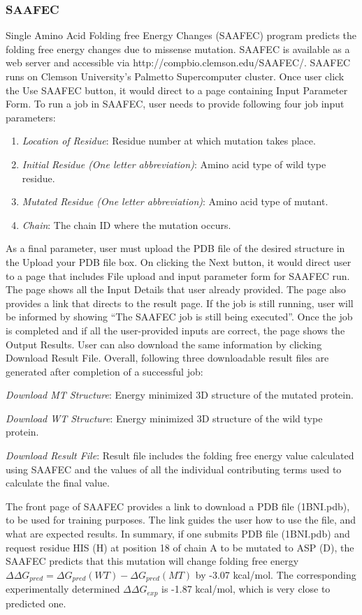 \documentclass[9pt,tutorial]{livecoms}
\begin{document}
\subsubsection{SAAFEC} Single Amino Acid Folding free Energy Changes (SAAFEC) program\cite{getov2016saafec} predicts the folding free energy changes due to missense mutation. SAAFEC is available as a web server and accessible via http://compbio.clemson.edu/SAAFEC/. SAAFEC runs on Clemson University’s Palmetto Supercomputer cluster. Once user click the Use SAAFEC button, it would direct to a page containing Input Parameter Form. To run a job in SAAFEC, user needs to provide following four job input parameters:
\begin{enumerate}
\item \textit{Location of Residue}: Residue number at which mutation takes place.
\item \textit{Initial Residue (One letter abbreviation)}: Amino acid type of wild type residue.
\item \textit{Mutated Residue (One letter abbreviation)}: Amino acid type of mutant. 
\item \textit{Chain}: The chain ID where the mutation occurs.
\end{enumerate}
As a final parameter, user must upload the PDB file of the desired structure in the Upload your PDB file box. On clicking the Next button, it would direct user to a page that includes File upload and input parameter form for SAAFEC run. The page shows all the Input Details that user already provided. The page also provides a link that directs to the result page. If the job is still running, user will be informed by showing ``The SAAFEC job is still being executed''. Once the job is completed and if all the user-provided inputs are correct, the page shows the Output Results. User can also download the same information by clicking Download Result File. Overall, following three downloadable result files are generated after completion of a successful job:

\textit{Download MT Structure}: Energy minimized 3D structure of the mutated protein.
	
\textit{Download WT Structure}: Energy minimized 3D structure of the wild type protein.

\textit{Download Result File}: Result file includes the folding free energy value calculated using SAAFEC and the values of all the individual contributing terms used to calculate the final value. 


The front page of SAAFEC provides a link to download a PDB file (1BNI.pdb), to be used for training purposes. The link guides the user how to use the file, and what are expected results. In summary, if one submits PDB file (1BNI.pdb) and request residue  HIS (H) at position 18 of chain A to be mutated to ASP (D), the SAAFEC predicts that this mutation will change folding free energy $ \Delta\Delta G_{pred} = \Delta G_{pred}(WT) - \Delta G_{pred}(MT) $ by -3.07 kcal/mol. The corresponding experimentally determined $ \Delta\Delta G_{exp} $ is  -1.87 kcal/mol, which is very close to predicted one.
\end{document}
